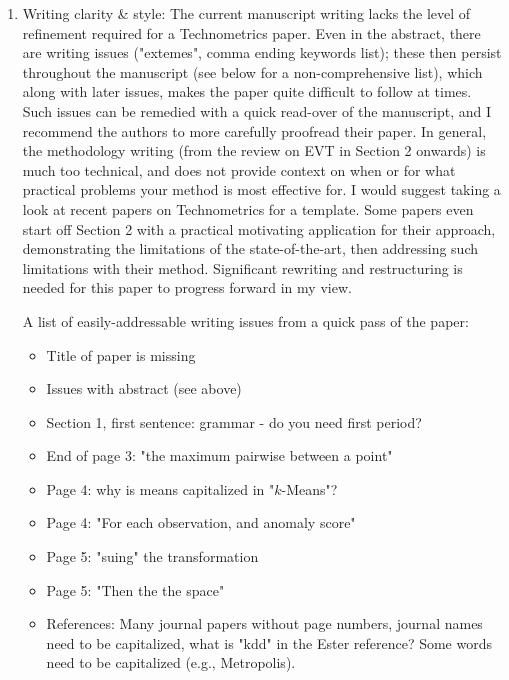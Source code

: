 \documentclass{article}
\begin{document}
\begin{enumerate}

\item Writing clarity \& style: The current manuscript writing lacks the level of refinement 
    required for a Technometrics paper. Even in the abstract, there are writing issues 
    ("extemes", comma ending keywords list); these then persist throughout the manuscript 
    (see below for a non-comprehensive list), which along with later issues, makes the paper 
    quite difficult to follow at times. Such issues can be remedied with a quick read-over of 
    the manuscript, and I recommend the authors to more carefully proofread their paper. In 
    general, the methodology writing (from the review on EVT in Section 2 onwards) is much too 
    technical, and does not provide context on when or for what practical problems your method 
    is most effective for. I would suggest taking a look at recent papers on Technometrics for 
    a template. Some papers even start off Section 2 with a practical motivating application 
    for their approach, demonstrating the limitations of the state-of-the-art, then addressing 
    such limitations with their method. Significant rewriting and restructuring is needed for 
    this paper to progress forward in my view. 

    A list of easily-addressable writing issues from a quick pass of the paper:
    \begin{itemize}
    \item Title of paper is missing
    \item Issues with abstract (see above)
    \item Section 1, first sentence: grammar - do you need first period? 
    \item End of page 3: "the maximum pairwise between a point"
    \item Page 4: why is means capitalized in "$k$-Means"?
    \item Page 4: "For each observation, and anomaly score"
    \item Page 5: "suing" the transformation
    \item Page 5: "Then the the space"
    \item References: Many journal papers without page numbers, journal names need to be 
        capitalized, what is "kdd" in the Ester reference? Some words need to be capitalized 
        (e.g., Metropolis).
    \end{itemize}


\end{enumerate}
\end{document}
